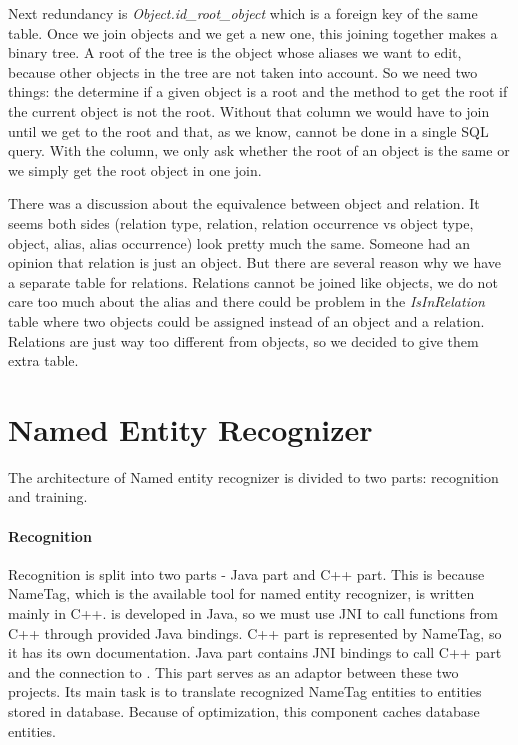 Next redundancy is \emph{Object.id\_{}root\_{}object} which is a foreign key of
the same table. Once we join objects and we get a new one, this joining together
makes a binary tree. A root of the tree is the object whose aliases we want to
edit, because other objects in the tree are not taken into account. So we need
two things: the determine if a given object is a root and the method to get the
root if the current object is not the root. Without that column we would have to
join until we get to the root and that, as we know, cannot be done in a single
SQL query. With the column, we only ask whether the root of an object is the
same or we simply get the root object in one join.

There was a discussion about the equivalence between object and relation. It
seems both sides (relation type, relation, relation occurrence vs object type,
object, alias, alias occurrence) look pretty much the same. Someone had an
opinion that relation is just an object. But there are several reason why we
have a separate table for relations. Relations cannot be joined like objects, we
do not care too much about the alias and there could be problem in the 
\emph{IsInRelation} table where two objects could be assigned instead of an
object and a relation. Relations are just way too different from objects, so we
decided to give them extra table.


\section{Named Entity Recognizer}
\label{sec:NamedEntityRecognizer}

The architecture of Named entity recognizer is divided to two parts: recognition and training.

\paragraph{Recognition} 
Recognition is split into two parts - Java part and C++ part. This is because
NameTag, which is the available tool for named entity recognizer, is written
mainly in C++. \textan{} is developed in Java, so we must use JNI to call
functions from C++ through provided Java bindings. C++ part is represented by
NameTag, so it has its own documentation. Java part contains JNI bindings to
call C++ part and the connection to \textan{}. This part serves as an adaptor
between these two projects. Its main task is to translate recognized NameTag
entities to entities stored in \textan{} database. Because of optimization, this
component caches database entities.

